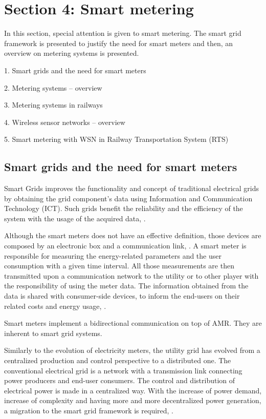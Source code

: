 


\section{Section 4: Smart metering}

In this section, special attention is given to smart metering. The smart grid framework is presented to justify the need for smart meters and then, an overview on metering systems is presented.


1.	Smart grids and the need for smart meters

2.	Metering systems – overview

3.	Metering systems in railways

4.	Wireless sensor networks – overview

5.	Smart metering with WSN in Railway Transportation System (RTS)

\subsection{Smart grids and the need for smart meters}

Smart Grids improves the functionality and concept of traditional electrical grids by obtaining the grid component's data using Information and Communication Technology (ICT). Such grids benefit the reliability and the efficiency of the system with the usage of the acquired data, \cite{Mohassel2014}.

Although the smart meters does not have an effective definition, those devices are composed by an electronic box and a communication link, \cite{Seppo2012}. A smart meter is responsible for measuring the energy-related parameters and the user consumption with a given time interval. All those measurements are then transmitted upon a communication network to the utility or to other player with the responsibility of using the meter data. The information obtained from the data is shared with consumer-side devices, to inform the end-users on their related costs and energy usage, \cite{Siano2014}.

Smart meters implement a bidirectional communication on top of AMR. They are inherent to smart grid systems. 

Similarly to the evolution of electricity meters, the utility grid has evolved from a centralized production and control perspective to a distributed one. The conventional electrical grid is a network with a transmission link connecting power producers and end-user consumers. The control and distribution of electrical power is made in a centralized way. With the increase of power demand, increase of complexity and having more and more decentralized power generation, a migration to the smart grid framework is required, \cite{Reddy2014}.

